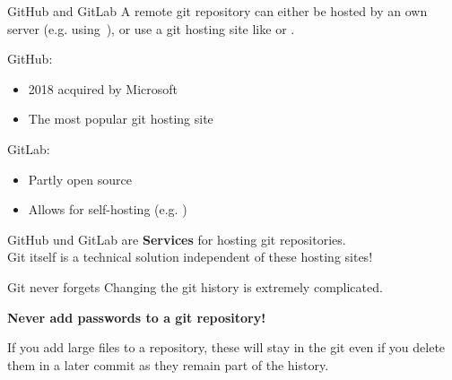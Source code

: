 \documentclass{setbeamer}
\begin{document}
\begin{frame}{GitHub and GitLab}
    A remote git repository can either be hosted by an own server (e.g. using~), or use a git hosting site like  or .

    \vspace{3mm}

    GitHub:
    \begin{itemize}
        \item 2018 acquired by Microsoft
        \item The most popular git hosting site
    \end{itemize}

    \vspace{3mm}

    GitLab:
    \begin{itemize}
        \item Partly open source
        \item Allows for self-hosting (e.g. )
    \end{itemize}

    \vspace{3mm}

    \begin{TUMBoxFill}[orange]{}{}
        GitHub und GitLab are \textbf{Services} for hosting git repositories.\\ Git itself is a technical solution independent of these hosting sites!
    \end{TUMBoxFill}
\end{frame}

\begin{frame}{Git never forgets}
    Changing the git history is extremely complicated.

    \begin{TUMBoxFill}[orange]{}{}
        \textbf{Never add passwords to a git repository!}
    \end{TUMBoxFill}

    \pause
    \vspace{3mm}

    \begin{TUMBoxFill}[orange]{}{}
        If you add large files to a repository, these will stay in the git even if you delete them in a later commit as they remain part of the history.
    \end{TUMBoxFill}

\end{frame}
\end{document}
